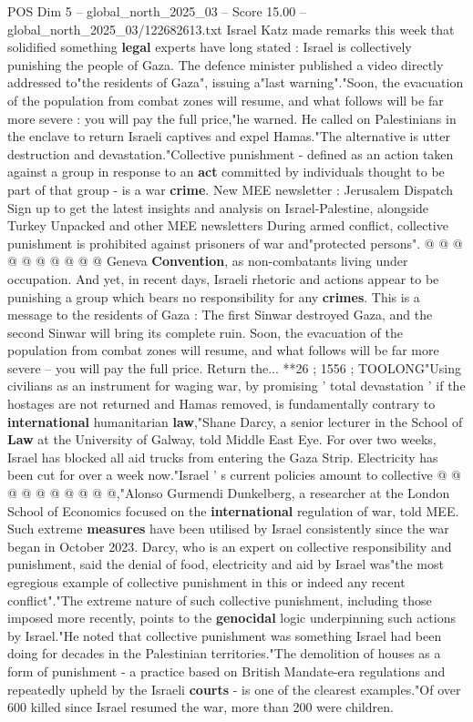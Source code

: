 \begin{textsample}{POS Dim 5 – global\_north\_2025\_03 – Score 15.00 – global\_north\_2025\_03/122682613.txt}  \label{ex:f5_pos_203}
Israel Katz made remarks this week that solidified something \textbf{legal} experts have long stated : Israel is collectively punishing the people of Gaza.
The defence minister published a video directly addressed to"the residents of Gaza", issuing a"last warning"."Soon, the evacuation of the population from combat zones will resume, and what follows will be far more severe : you will pay the full price,"he warned.
He called on Palestinians in the enclave to return Israeli captives and expel Hamas."The alternative is utter destruction and devastation."Collective punishment - defined as an action taken against a group in response to an \textbf{act} committed by individuals thought to be part of that group - is a war \textbf{crime}.
New MEE newsletter : Jerusalem Dispatch Sign up to get the latest insights and analysis on Israel-Palestine, alongside Turkey Unpacked and other MEE newsletters During armed conflict, collective punishment is prohibited against prisoners of war and"protected persons". @ @ @ @ @ @ @ @ @ @ Geneva \textbf{Convention}, as non-combatants living under occupation.
And yet, in recent days, Israeli rhetoric and actions appear to be punishing a group which bears no responsibility for any \textbf{crimes}.
This is a message to the residents of Gaza : The first Sinwar destroyed Gaza, and the second Sinwar will bring its complete ruin.
Soon, the evacuation of the population from combat zones will resume, and what follows will be far more severe -- you will pay the full price.
Return the... **26 ; 1556 ; TOOLONG"Using civilians as an instrument for waging war, by promising ' total devastation ' if the hostages are not returned and Hamas removed, is fundamentally contrary to \textbf{international} humanitarian \textbf{law},"Shane Darcy, a senior lecturer in the School of \textbf{Law} at the University of Galway, told Middle East Eye.
For over two weeks, Israel has blocked all aid trucks from entering the Gaza Strip.
Electricity has been cut for over a week now."Israel ' s current policies amount to collective @ @ @ @ @ @ @ @ @ @,"Alonso Gurmendi Dunkelberg, a researcher at the London School of Economics focused on the \textbf{international} regulation of war, told MEE.
Such extreme \textbf{measures} have been utilised by Israel consistently since the war began in October 2023.
Darcy, who is an expert on collective responsibility and punishment, said the denial of food, electricity and aid by Israel was"the most egregious example of collective punishment in this or indeed any recent conflict"."The extreme nature of such collective punishment, including those imposed more recently, points to the \textbf{genocidal} logic underpinning such actions by Israel."He noted that collective punishment was something Israel had been doing for decades in the Palestinian territories."The demolition of houses as a form of punishment - a practice based on British Mandate-era regulations and repeatedly upheld by the Israeli \textbf{courts} - is one of the clearest examples."Of over 600 killed since Israel resumed the war, more than 200 were children.

\end{textsample}
